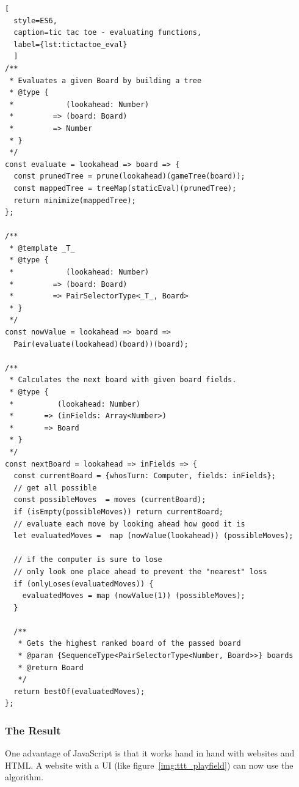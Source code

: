 \begin{lstlisting}[
  style=ES6, 
  caption=tic tac toe - evaluating functions,
  label={lst:tictactoe_eval}
  ]
/**
 * Evaluates a given Board by building a tree
 * @type {
 *            (lookahead: Number)
 *         => (board: Board)
 *         => Number
 * }
 */
const evaluate = lookahead => board => {
  const prunedTree = prune(lookahead)(gameTree(board));
  const mappedTree = treeMap(staticEval)(prunedTree);
  return minimize(mappedTree);
};

/**
 * @template _T_
 * @type {
 *            (lookahead: Number)
 *         => (board: Board)
 *         => PairSelectorType<_T_, Board>
 * }
 */
const nowValue = lookahead => board =>
  Pair(evaluate(lookahead)(board))(board);

/**
 * Calculates the next board with given board fields.
 * @type {
 *          (lookahead: Number)
 *       => (inFields: Array<Number>)
 *       => Board
 * }
 */
const nextBoard = lookahead => inFields => {
  const currentBoard = {whosTurn: Computer, fields: inFields};
  // get all possible
  const possibleMoves  = moves (currentBoard);
  if (isEmpty(possibleMoves)) return currentBoard;
  // evaluate each move by looking ahead how good it is
  let evaluatedMoves =  map (nowValue(lookahead)) (possibleMoves);

  // if the computer is sure to lose 
  // only look one place ahead to prevent the "nearest" loss
  if (onlyLoses(evaluatedMoves)) {
    evaluatedMoves = map (nowValue(1)) (possibleMoves);
  }

  /**
   * Gets the highest ranked board of the passed board
   * @param {SequenceType<PairSelectorType<Number, Board>>} boards
   * @return Board
   */
  return bestOf(evaluatedMoves);
};
\end{lstlisting}

\subsubsection{The Result} %
\label{sec:ttt_result}
One advantage of JavaScript is that it works hand in hand with websites and
HTML. A website with a UI (like figure~\ref{img:ttt_playfield}) can now use the
algorithm.\\

